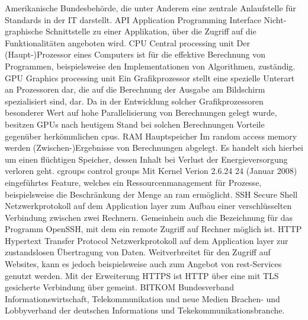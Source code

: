   {Amerikanische Bundesbehörde, die unter Anderem eine zentrale Anlaufstelle für Standards in der IT darstellt.}
  {API}               %
  {Application Programming Interface}
  {Nicht-graphische Schnittstelle zu einer Applikation, über die Zugriff auf die Funktionalitäten angeboten wird.}
  {CPU}               %
  {Central processing unit}  %
  {Der (Haupt-)Prozessor eines Computers ist für die effektive Berechnung von Programmen, beispielsweise den Implementationen von Algorithmen, zuständig.}
  {GPU}               %
  {Graphics processing unit}  %
  {Ein Grafikprozessor stellt eine spezielle Unterart an Prozessoren dar, die auf die Berechnung der Ausgabe am Bildschirm spezialisiert sind, dar. Da in der Entwicklung solcher Grafikprozessoren besonderer Wert auf hohe Parallelisierung von Berechnungen gelegt wurde, besitzen GPUs nach heutigem Stand bei solchen Berechnungen Vorteile gegenüber herkömmlichen \gls{cpu}s.}
  {RAM}               %
  {Hauptspeicher}  %
  {Im random access memory werden (Zwischen-)Ergebnisse von Berechnungen abgelegt. Es handelt sich hierbei um einen flüchtigen Speicher, dessen Inhalt bei Verlust der Energieversorgung verloren geht.}
  {cgroups}               %
  {control groups}  %
  {Mit Kernel Verion 2.6.24 24 (Januar 2008) \cite{kernel264} eingeführtes Feature, welches ein Ressourcenmanagement für Prozesse, beispielsweise die Beschränkung der Menge an \gls{ram} ermöglicht.}
  {SSH}               %
  {Secure Shell}  %
  {Netzwerkprotokoll auf dem Application layer zum Aufbau einer verschlüsselten Verbindung zwischen zwei Rechnern. Gemeinhein auch die Bezeichnung für das Programm OpenSSH, mit dem ein remote  Zugriff auf Rechner möglich ist.}
  {HTTP}               %
  {Hypertext Transfer Protocol}  %
  {Netzwerkprotokoll auf dem Application layer zur zustandslosen Übertragung von Daten. Weitverbreitet für den Zugriff auf Websites, kann es jedoch beispielsweise auch zum Angebot von \gls{rest}-Services genutzt werden. Mit der Erweiterung HTTPS ist HTTP über eine mit TLS gesicherte Verbindung über gemeint.}
  {BITKOM}               %
  {Bundesverband Informationswirtschaft, Telekommunikation und neue Medien}
  {Brachen- und Lobbyverband der deutschen Informations und Tekekommunikationsbranche.}
